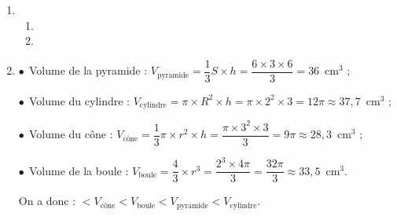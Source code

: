 
\medskip

%
%
%
%
%
\begin{enumerate}
\item
\begin{enumerate}

\item %

\item %
\end{enumerate}
\item %
$\bullet~~$Volume de la pyramide : $V_{\text{pyramide}}  = \dfrac{1}{3} S \times h = \dfrac{6 \times 3 \times 6}{3} = 36$~cm$^3$ ;

$\bullet~~$Volume du cylindre : $V_{\text{cylindre}} =  \pi \times R^2 \times h = \pi \times 2^2 \times 3 = 12 \pi \approx 37,7$~cm$^3$ ;

$\bullet~~$Volume du cône : $V_{\text{cône}}  = \dfrac{1}{3} \pi \times r^2 \times h = \dfrac{\pi \times 3^2 \times 3}{3} = 9\pi \approx 28,3$~cm$^3$ ;

$\bullet~~$Volume de la boule : $V_{\text{boule}}  = \dfrac{4}{3}\times r^3 = \dfrac{2^3 \times 4 \pi}{3} = \dfrac{32\pi}{3} \approx 33,5$~cm$^3$.

On a donc : $ < V_{\text{cône}}  < V_{\text{boule}} < V_{\text{pyramide}} < V_{\text{cylindre}}$.
\end{enumerate}

%
%
%
%

\bigskip

